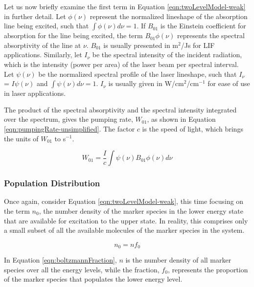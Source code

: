 Let us now briefly examine the first term in Equation \ref{eqn:twoLevelModel-weak} in further detail.
Let \(\phi(\nu)\) represent the normalized lineshape of the absorption line being excited, such that \(\int \phi(\nu) d\nu = 1\).
If \(B_{01}\) is the Einstein coefficient for absorption for the line being excited, the term \(B_{01}\phi(\nu)\) represents the spectral absorptivity of the line at \(\nu\).
\(B_{01}\) is usually presented in m\(^2\)/Js for LIF applications.
Similarly, let \(I_\nu\) be the spectral intensity of the incident radiation, which is the intensity (power per area) of the laser beam per spectral interval.
Let \(\psi(\nu)\) be the normalized spectral profile of the laser lineshape, such that \(I_\nu\) = \(I \psi(\nu)\) and \(\int \psi(\nu) d\nu = 1\).
\(I_\nu\) is usually given in W/cm\(^2\)/cm\(^{-1}\) for ease of use in laser applications.

The product of the spectral absorptivity and the spectral intensity integrated over the spectrum, gives the pumping rate, \(W_{01}\), as shown in Equation \ref{eqn:pumpingRate-unsimplified}.
The factor \(c\) is the speed of light, which brings the units of \(W_{01}\) to s\(^{-1}\).

\begin{equation}
  W_{01} = \frac{I}{c} \int \psi(\nu) B_{01}\phi(\nu) d\nu
  \label{eqn:pumpingRate-unsimplified}
\end{equation}

\subsubsection{Population Distribution}
\label{subsubsec:basic-model-population-distribution}

Once again, consider Equation \ref{eqn:twoLevelModel-weak}, this time focusing on the term \(n_0\), the number density of the marker species in the lower energy state that are available for excitation to the upper state.
In reality, this comprises only a small subset of all the available molecules of the marker species in the system.

\begin{equation}
  n_0 = nf_0
  \label{eqn:boltzmannFraction}
\end{equation}

In Equation \ref{eqn:boltzmannFraction}, \(n\) is the number density of all marker species over all the energy levels, while the fraction, \(f_0\), represents the proportion of the marker species that populates the lower energy level.

